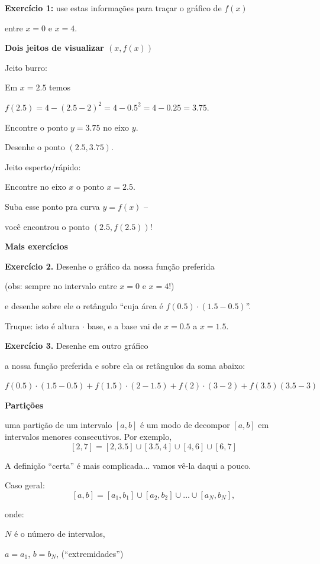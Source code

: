 \documentclass[oneside,12pt]{article}
\begin{document}
\msk

{\bf Exercício 1:} use estas informações para traçar o gráfico de $f(x)$

entre $x=0$ e $x=4$.


\newpage

{\bf Dois jeitos de visualizar $(x,f(x))$}

Jeito burro:

Em $x=2.5$ temos

$f(2.5) = 4 - (2.5-2)^2 = 4 - 0.5^2 = 4-0.25 = 3.75$.

Encontre o ponto $y=3.75$ no eixo $y$.

Desenhe o ponto $(2.5,3.75)$.

\msk

Jeito esperto/rápido:

Encontre no eixo $x$ o ponto $x=2.5$.

Suba esse ponto pra curva $y=f(x)$ --

você encontrou o ponto $(2.5,f(2.5))$!


\newpage

{\bf Mais exercícios}

{\bf Exercício 2.} Desenhe o gráfico da nossa função preferida

(obs: sempre no intervalo entre $x=0$ e $x=4$!)

e desenhe sobre ele o retângulo ``cuja área é $f(0.5)·(1.5-0.5)$''.

Truque: isto é altura $·$ base, e a base vai de $x=0.5$ a $x=1.5$.

\msk

{\bf Exercício 3.} Desenhe em outro gráfico

a nossa função preferida e sobre ela os retângulos da soma abaixo:

$f(0.5)·(1.5-0.5) + f(1.5)·(2-1.5) + f(2)·(3-2) + f(3.5)(3.5-3)$

\newpage

{\bf Partições}

 uma partição de um intervalo $[a,b]$ é um
modo de decompor $[a,b]$ em intervalos menores consecutivos. Por
exemplo, 
%
$$[2,7] = [2,3.5]∪[3.5,4]∪[4,6]∪[6,7]$$

A definição ``certa'' é mais complicada... vamos vê-la daqui a pouco.

Caso geral:
%
$$[a,b] = [a_1,b_1]∪[a_2,b_2]∪\ldots∪[a_N,b_N],$$

onde:

$N$ é o número de intervalos,

$a=a_1$, $b=b_N$, (``extremidades'')
\end{document}
